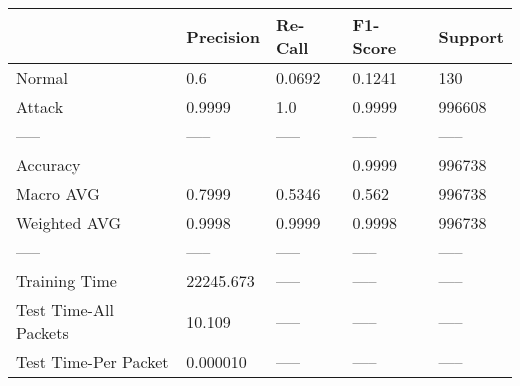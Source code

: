 \begin{tabular}{lllll}
\toprule
{} &  Precision & Re-Call & F1-Score & Support \\
\midrule
Normal                &        0.6 &  0.0692 &   0.1241 &     130 \\
Attack                &     0.9999 &     1.0 &   0.9999 &  996608 \\
-----                 &      ----- &   ----- &    ----- &   ----- \\
Accuracy              &            &         &   0.9999 &  996738 \\
Macro AVG             &     0.7999 &  0.5346 &    0.562 &  996738 \\
Weighted AVG          &     0.9998 &  0.9999 &   0.9998 &  996738 \\
-----                 &      ----- &   ----- &    ----- &   ----- \\
Training Time         &  22245.673 &   ----- &    ----- &   ----- \\
Test Time-All Packets &     10.109 &   ----- &    ----- &   ----- \\
Test Time-Per Packet  &   0.000010 &   ----- &    ----- &   ----- \\
\bottomrule
\end{tabular}
